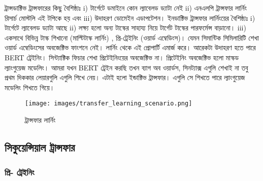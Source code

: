 \documentclass{book}
\begin{document}
ট্রান্সডাক্টিভ ট্রান্সফারের কিছু বৈশিষ্ঠ্যঃ i) টার্গেটে ডমাইনে কোন ল্যাবেলড ড্যাটা নেই ii) এনএলপি ট্রান্সফার লার্নিং রিসার্চ মোস্টলি এই টপিকে হয় এবং   iii) উদাহরণ ডোমেইন এডাপটেশন। ইনডাক্টিভ ট্রান্সফার লার্নিংয়ের বৈশিষ্ঠ্যঃ i) টার্গেটে ল্যাবেলড ড্যাটা আছে ii) লক্ষ্য হলো অন্য টাস্কের সাহায্য নিয়ে টার্গেট টাস্কের পারফর্মেন্স বাড়ানো। iii) একসাথে বিভিন্ন টাস্ক শিখানো (মাল্টিটাস্ক লার্নিং) , প্রি-ট্রেইনিং (ওয়ার্ড এম্বেডিংস)। যেমন সিমান্টিক সিমিলারিটি শেখা ওয়ার্ড এম্বেডিংসের অবজেক্টিভ ফাংশনে নেই। লার্নিং থেকে এই প্রোপার্টি এমার্জ করে। আরেকটা উদাহরণ হতে পারে BERT ট্রেইনিং। সিন্ট্যাক্টিক ফিচার শেখা প্রিটেইনিংয়ের অবজেক্টিভ না। প্রিটেইনিং অবজেক্টিভ হলো মাস্কড ল্যাংগুয়েজ মডেলিং। আমরা যখন BERT ট্রেইন করছি তখন ব্যাগ অব ওয়ার্ডস, সিনট্যাক্স এগুলি শেখাই না তবু প্রথম দিককার লেয়ারগুলি এগুলি শিখে নেয়। এটাই হলো ইন্ডাক্টিভ ট্রান্সফার। এগুলি সে শিখতে পারে ল্যাংগুয়েজ মডেলিং শিখতে গিয়ে।



\begin{figure}[htbp] %
   \centering
   \texttt{[image: images/transfer\_learning\_scenario.png]} 
   \caption{ট্রান্সফার লার্নিং}
   \label{fig:ruder_transfer_learning}
\end{figure} 

\subsection{সিকুয়েন্সিয়াল ট্রান্সফার}

\subsubsection{প্রি- ট্রেইনিং}
\end{document}
